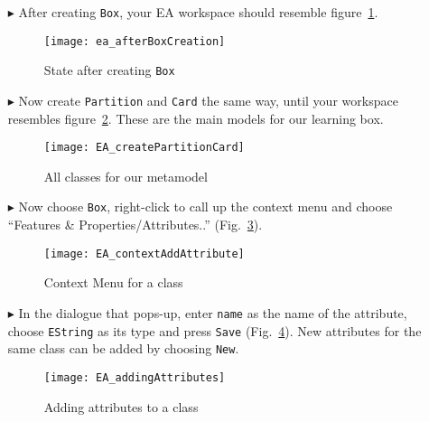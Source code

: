 \begin{itemize}
\vfill
\pagebreak

\item[$\blacktriangleright$] After creating \texttt{Box}, your EA workspace should resemble figure~\ref{fig:eclass_completed}.

\begin{figure}[htbp]
	\centering
  \texttt{[image: ea\_afterBoxCreation]}
	\caption{State after creating \texttt{Box}}
	\label{fig:eclass_completed}
\end{figure}

\item[$\blacktriangleright$] Now create \texttt{Partition} and \texttt{Card} the same way, until your workspace resembles figure~\ref{fig:all_eclasses}.
These are the main models for our learning box.

\vspace{1cm}

\begin{figure}[htbp]
	\centering
  \texttt{[image: EA\_createPartitionCard]}
	\caption{All classes for our metamodel}
	\label{fig:all_eclasses}
\end{figure}

\vfill
\pagebreak

\item[$\blacktriangleright$] Now choose \texttt{Box}, right-click to call up the context menu and choose ``Features \& Properties/Attributes..'' (Fig.~\ref{fig:attribute}).

\begin{figure}[htbp]
	\centering
  \texttt{[image: EA\_contextAddAttribute]}
	\caption{Context Menu for a class}
	\label{fig:attribute}
\end{figure}
\FloatBarrier

\vspace{0.5cm}

\item[$\blacktriangleright$] In the dialogue that pops-up, enter \texttt{name} as the name of the attribute, choose \texttt{EString} as its type and press \texttt{Save} (Fig.~\ref{fig:attribute_properties}). New attributes for the same class can be added by choosing \texttt{New}.

\vspace{0.5cm}

\begin{figure}[htbp]
	\centering
  \texttt{[image: EA\_addingAttributes]}
	\caption{Adding attributes to a class}
	\label{fig:attribute_properties}
\end{figure}


\end{itemize}
